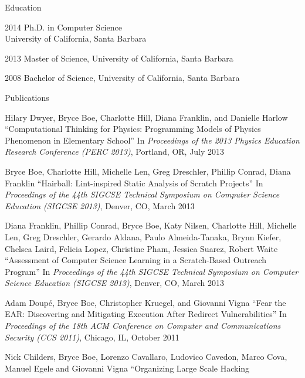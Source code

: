 \begin{vitae}
{\small

\begin{vitaesection}{Education}
\vspace{-0.1cm}
  \item [2014] Ph.D. in Computer Science\\ University of California, Santa
    Barbara
  \item [2013] Master of Science, University of California, Santa Barbara
  \item [2008] Bachelor of Science, University of California, Santa Barbara
\end{vitaesection}

\begin{vitaesection}{Publications}
\vspace{-0.1cm}
  \item Hilary Dwyer, Bryce Boe, Charlotte Hill, Diana Franklin, and Danielle
    Harlow ``Computational Thinking for Physics: Programming Models of Physics
    Phenomenon in Elementary School'' In \emph{Proceedings of the 2013 Physics
      Education Research Conference (PERC 2013)}, Portland, OR, July 2013
  \item Bryce Boe, Charlotte Hill, Michelle Len, Greg Dreschler, Phillip
    Conrad, Diana Franklin ``Hairball: Lint-inspired Static Analysis of Scratch
    Projects'' In \emph{Proceedings of the 44th SIGCSE Technical Symposium on
      Computer Science Education (SIGCSE 2013)}, Denver, CO, March 2013
  \item Diana Franklin, Phillip Conrad, Bryce Boe, Katy Nilsen, Charlotte Hill,
    Michelle Len, Greg Dreschler, Gerardo Aldana, Paulo Almeida-Tanaka, Brynn
    Kiefer, Chelsea Laird, Felicia Lopez, Christine Pham, Jessica Suarez,
    Robert Waite ``Assessment of Computer Science Learning in a Scratch-Based
    Outreach Program'' In \emph{Proceedings of the 44th SIGCSE Technical
      Symposium on Computer Science Education (SIGCSE 2013)}, Denver, CO, March
    2013
  \item Adam Doup\'e, Bryce Boe, Christopher Kruegel, and Giovanni Vigna ``Fear
    the EAR: Discovering and Mitigating Execution After Redirect
    Vulnerabilities'' In \emph{Proceedings of the 18th ACM Conference on
      Computer and Communications Security (CCS 2011)}, Chicago, IL, October
    2011
  \item Nick Childers, Bryce Boe, Lorenzo Cavallaro, Ludovico Cavedon, Marco
    Cova, Manuel Egele and Giovanni Vigna ``Organizing Large Scale Hacking

\end{vitaesection}}
\end{vitae}
